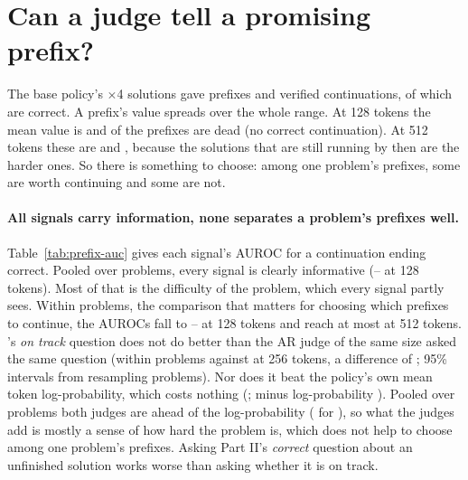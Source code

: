 
\section{Can a judge tell a promising prefix?}\label{sec:res-prefix}

The base policy's $\times$4 solutions gave  prefixes and 
verified continuations, of which  are correct. A prefix's value spreads over the whole range. At
128 tokens the mean value is  and  of the prefixes are dead (no correct
continuation). At 512 tokens these are  and , because the solutions that are still
running by then are the harder ones. So there is something to choose: among one problem's prefixes, some are worth
continuing and some are not.

\paragraph{All signals carry information, none separates a problem's prefixes well.} Table~\ref{tab:prefix-auc} gives
each signal's AUROC for a continuation ending correct. Pooled over problems, every signal is clearly informative
(-- at 128 tokens). Most of that is the difficulty of the problem, which every
signal partly sees. Within problems, the comparison that matters for choosing which prefixes to continue, the AUROCs
fall to -- at 128 tokens and reach at most  at
512 tokens. \kev{}'s \emph{on track} question does not do better than the AR judge of the same size asked the same
question (within problems  against  at 256 tokens, a difference of
 ; 95\% intervals
from resampling problems). Nor does it beat the policy's own mean token log-probability, which costs nothing
(; \kev{} minus log-probability 
). Pooled over problems both judges are ahead of
the log-probability ( 
for \kev{}), so what the judges add is mostly a sense of how hard the problem is, which does not help to choose among
one problem's prefixes. Asking \kev{} Part II's \emph{correct} question about an unfinished solution works worse than
asking whether it is on track.

